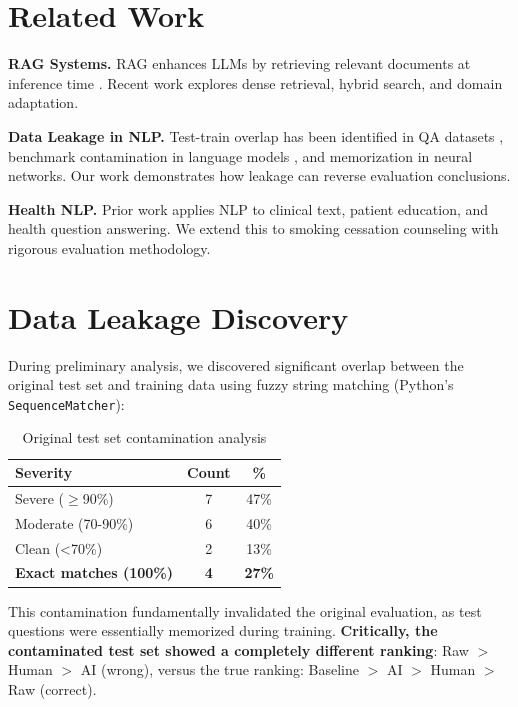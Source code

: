 \documentclass[11pt]{article}
\begin{document}
\section{Related Work}

\textbf{RAG Systems.} RAG enhances LLMs by retrieving relevant documents at inference time \cite{lewis2020retrieval}. Recent work explores dense retrieval, hybrid search, and domain adaptation.

\textbf{Data Leakage in NLP.} Test-train overlap has been identified in QA datasets \cite{lewis2021questionanswering}, benchmark contamination in language models \cite{dodge2021documenting}, and memorization in neural networks. Our work demonstrates how leakage can reverse evaluation conclusions.

\textbf{Health NLP.} Prior work applies NLP to clinical text, patient education, and health question answering. We extend this to smoking cessation counseling with rigorous evaluation methodology.

\section{Data Leakage Discovery}

During preliminary analysis, we discovered significant overlap between the original test set and training data using fuzzy string matching (Python's \texttt{SequenceMatcher}):

\begin{table}[h]
\centering
\small
\begin{tabular}{lcc}
\toprule
\textbf{Severity} & \textbf{Count} & \textbf{\%} \\
\midrule
Severe ($\geq$90\%) & 7 & 47\% \\
Moderate (70-90\%) & 6 & 40\% \\
Clean (<70\%) & 2 & 13\% \\
\textbf{Exact matches (100\%)} & \textbf{4} & \textbf{27\%} \\
\bottomrule
\end{tabular}
\caption{Original test set contamination analysis}
\label{tab:leakage}
\end{table}

This contamination fundamentally invalidated the original evaluation, as test questions were essentially memorized during training. \textbf{Critically, the contaminated test set showed a completely different ranking}: Raw $>$ Human $>$ AI (wrong), versus the true ranking: Baseline $>$ AI $>$ Human $>$ Raw (correct).
\end{document}
